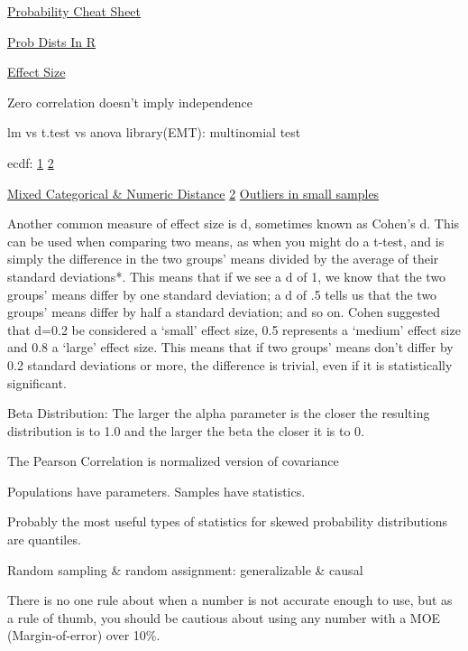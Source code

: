 \documentclass[]{book}
\begin{document}
\href{http://www.wzchen.com/probability-cheatsheet}{Probability Cheat Sheet}

\href{http://www.cyclismo.org/tutorial/R/probability.html}{Prob Dists In R}

\href{https://www.leeds.ac.uk/educol/documents/00002182.htm}{Effect Size}

Zero correlation doesn't imply independence

lm vs t.test vs anova library(EMT): multinomial test

ecdf: \href{http://www.ericmjl.com/blog/2018/7/14/ecdfs/}{1} \href{https://www.rdocumentation.org/packages/stats/versions/3.4.3/topics/ecdf}{2}

\href{https://www.rdocumentation.org/packages/StatMatch/versions/1.2.5/topics/gower.dist}{Mixed Categorical \& Numeric Distance} \href{https://www.rdocumentation.org/packages/ltm/versions/1.1-1/topics/biserial.cor}{2} \href{https://stats.stackexchange.com/questions/78609/outlier-detection-in-very-small-sets/78617\#78617}{Outliers in small samples}

Another common measure of effect size is d, sometimes known as Cohen's d. This can be used when comparing two means, as when you might do a t-test, and is simply the difference in the two groups' means divided by the average of their standard deviations*. This means that if we see a d of 1, we know that the two groups' means differ by one standard deviation; a d of .5 tells us that the two groups' means differ by half a standard deviation; and so on. Cohen suggested that d=0.2 be considered a `small' effect size, 0.5 represents a `medium' effect size and 0.8 a `large' effect size. This means that if two groups' means don't differ by 0.2 standard deviations or more, the difference is trivial, even if it is statistically significant.

Beta Distribution: The larger the alpha parameter is the closer the resulting distribution is to 1.0 and the larger the beta the closer it is to 0.

The Pearson Correlation is normalized version of covariance

Populations have parameters. Samples have statistics.

Probably the most useful types of statistics for skewed probability distributions are quantiles.

Random sampling \& random assignment: generalizable \& causal

There is no one rule about when a number is not accurate enough to use, but as a rule of thumb, you should be cautious about using any number with a MOE (Margin-of-error) over 10\%.
\end{document}
